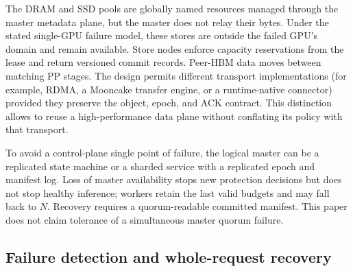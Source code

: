 The DRAM and SSD pools are globally named resources managed through the master
metadata plane, but the master does not relay their bytes.  Under the stated
single-GPU failure model, these stores are outside the failed GPU's domain and
remain available.  Store nodes enforce capacity reservations from the lease
and return versioned commit records.
Peer-HBM data moves between matching PP stages.  The design permits different
transport implementations (for example, RDMA, a Mooncake transfer engine, or a
runtime-native connector) provided they preserve the object, epoch, and ACK
contract.  This distinction allows \system{} to reuse a high-performance data
plane without conflating its policy with that transport.

To avoid a control-plane single point of failure, the logical master can be a
replicated state machine or a sharded service with a replicated epoch and
manifest log.  Loss of master availability stops new protection decisions but
does not stop healthy inference; workers retain the last valid budgets and may
fall back to $N$.  Recovery requires a quorum-readable committed manifest.
This paper does not claim tolerance of a simultaneous master quorum failure.

\subsection{Failure detection and whole-request recovery}

